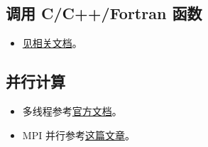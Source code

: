 \subsection{调用 C/C++/Fortran 函数}
\begin{itemize}
\item \href{https://docs.julialang.org/en/v1/manual/calling-c-and-fortran-code/}{见相关文档}。
\end{itemize}

\subsection{并行计算}
\begin{itemize}
\item 多线程参考\href{https://docs.julialang.org/en/v1/manual/multi-threading/}{官方文档}。
\item MPI 并行参考\href{http://www.claudiobellei.com/2018/09/30/julia-mpi/}{这篇文章}。
\end{itemize}
